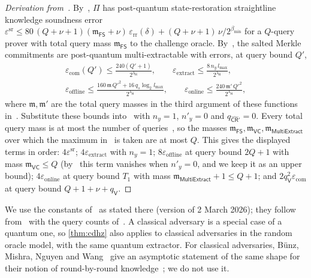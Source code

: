 \begin{proof}[Derivation from~\cite{CDHZ25}]
By~\cite[Theorem~6.10]{CDHZ25}, $\Pi$ has post-quantum state-restoration straightline knowledge soundness error $\varepsilon^{\mathrm{sr}} \le 80\,(Q+\nu+1)(\mathfrak{m}_{\mathsf{FS}}+\nu)\,\varepsilon_{\mathrm{rr}}(\delta) + (Q+\nu+1)\,\nu/2^{\beta_{\min}}$ for a $Q$-query prover with total query mass $\mathfrak{m}_{\mathsf{FS}}$ to the challenge oracle.
By~\cite[Theorem~8.3]{CDHZ25}, the salted Merkle commitments are post-quantum multi-extractable with errors, at query bound $Q'$,
\begin{gather*}
  \varepsilon_{\mathrm{com}}(Q') \le \frac{240(Q'+1)}{2^{\lambda_{\mathsf{H}}}}, \qquad \varepsilon_{\mathrm{extract}} \le \frac{8\,n_y\,l_{\max}}{2^{\lambda_{\mathsf{H}}}}, \\
  \varepsilon_{\mathrm{offline}} \le \frac{160\, \mathfrak{m}\, Q'^2 + 16\, q_s \log_2 l_{\max}}{2^{\lambda_{\mathsf{H}}}}, \qquad \varepsilon_{\mathrm{online}} \le \frac{240\, \mathfrak{m}'\, Q'^2}{2^{\lambda_{\mathsf{H}}}},
\end{gather*}
where $\mathfrak{m}, \mathfrak{m}'$ are the total query masses in the third argument of these functions in~\cite{CDHZ25}.
Substitute these bounds into~\cite[Theorem~11.3]{CDHZ25} with $n_y = 1$, $n'_y = 0$ and $q_{\widehat{\mathsf{CR}}'} = 0$.
Every total query mass is at most the number of queries~\cite[Definition~4.3 and Remark~4.2]{CDHZ25}, so the masses $\mathfrak{m}_{\mathsf{FS}}, \mathfrak{m}_{\mathsf{VC}}, \mathfrak{m}_{\mathsf{MultiExtract}}$ over which the maximum in~\cite[Theorem~11.3]{CDHZ25} is taken are at most $Q$.
This gives the displayed terms in order: $4\varepsilon^{\mathrm{sr}}$; $4\varepsilon_{\mathrm{extract}}$ with $n_y = 1$; $8\varepsilon_{\mathrm{offline}}$ at query bound $2Q+1$ with mass $\mathfrak{m}_{\mathsf{VC}} \le Q$ (by~\cite[Remark~11.5]{CDHZ25} this term vanishes when $n'_y = 0$, and we keep it as an upper bound); $4\varepsilon_{\mathrm{online}}$ at query bound $T_1$ with mass $\mathfrak{m}_{\mathsf{MultiExtract}} + 1 \le Q+1$; and $2 q_{\mathsf{V}}^2 \varepsilon_{\mathrm{com}}$ at query bound $Q+1+\nu+q_{\mathsf{V}}$.
\end{proof}

We use the constants of~\cite[Theorem~8.3]{CDHZ25} as stated there (version of 2 March 2026); they follow from~\cite[Theorem~8.4, Lemmas~8.7 and~8.8]{CDHZ25} with the query counts of~\cite[\S8.3]{CDHZ25}.
A classical adversary is a special case of a quantum one, so \cref{thm:cdhz} also applies to classical adversaries in the random oracle model, with the same quantum extractor.
For classical adversaries, B\"unz, Mishra, Nguyen and Wang~\cite[Theorem~5.9]{BMNW24} give an asymptotic statement of the same shape for their notion of round-by-round knowledge~\cite[Definition~5.5]{BMNW24}; we do not use it.
